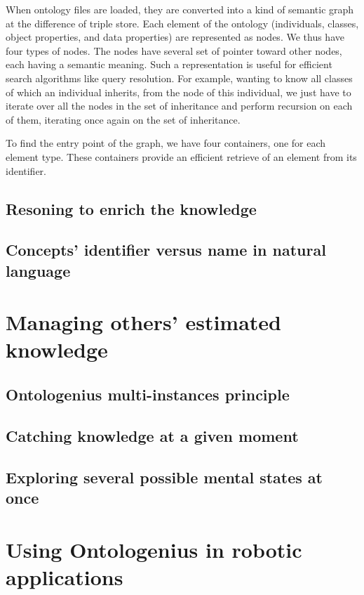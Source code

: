 When ontology files are loaded, they are converted into a kind of semantic graph at the difference of triple store. Each element of the ontology (individuals, classes, object properties, and data properties) are represented as nodes. We thus have four types of nodes. The nodes have several set of pointer toward other nodes, each having a semantic meaning. Such a representation is useful for efficient search algorithms like query resolution. For example, wanting to know all classes of which an individual inherits, from the node of this individual, we just have to iterate over all the nodes in the set of inheritance and perform recursion on each of them, iterating once again on the set of inheritance.

To find the entry point of the graph, we have four containers, one for each element type. These containers provide an efficient retrieve of an element from its identifier.

\subsection{Resoning to enrich the knowledge}

\subsection{Concepts' identifier versus name in natural language}



\section{Managing others' estimated knowledge}

\subsection{Ontologenius multi-instances principle}

\subsection{Catching knowledge at a given moment}

\subsection{Exploring several possible mental states at once}



\section{Using Ontologenius in robotic applications}

